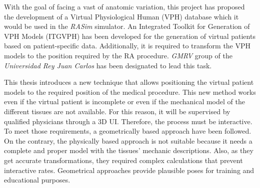 With the goal of facing a vast of anatomic variation, this project has proposed the development of a Virtual Physiological Human (VPH) database which it would be used in the \emph{RASim} simulator. An Integrated Toolkit for Generation of VPH Models (ITGVPH) has been developed for the generation of virtual patients based on patient-specific data. Additionally, it is required to transform the VPH models to the position required by the RA procedure. \emph{GMRV} group of the  \emph{Universidad Rey Juan Carlos} has been designated to lead this task.


This thesis introduces a new technique that allows positioning the virtual patient models to the required position of the medical procedure. This new method works even if the virtual patient is incomplete or even if the mechanical model of the different tissues are not available. For this reason, it will be supervised by qualified physicians through a 3D UI. Therefore, the process must be interactive. To meet those requirements, a geometrically based approach have been followed. On the contrary, the physically based approach is not suitable because it needs a complete and proper model with the tissues' mechanic descriptions. Also, as they get accurate transformations, they required complex calculations that prevent interactive rates. Geometrical approaches provide plausible poses for training and educational purposes.

